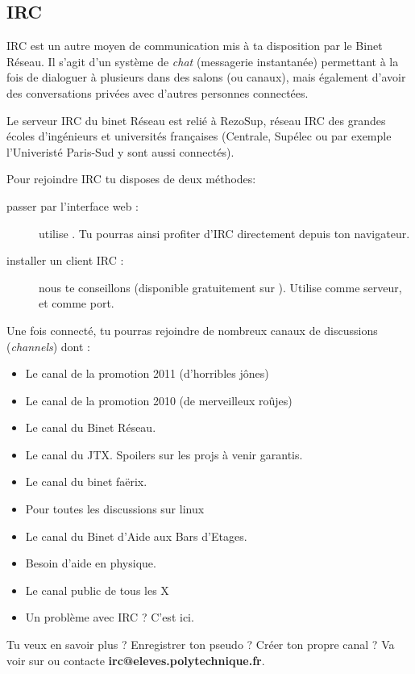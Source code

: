 
\subsection{IRC}

\label{irc}

IRC est un autre moyen de communication mis à ta disposition par le Binet Réseau. Il s'agit d'un système de \emph{chat} (messagerie instantanée) permettant à la fois de dialoguer à plusieurs dans des salons (ou canaux), mais également d'avoir des conversations privées avec d'autres personnes connectées.


Le serveur IRC du binet Réseau est relié à RezoSup, réseau IRC des grandes écoles d'ingénieurs et universités françaises (Centrale, Supélec ou par exemple l'Univeristé Paris-Sud y sont aussi connectés).

Pour rejoindre IRC tu disposes de deux méthodes:

                  
\begin{description}
  \item[passer par l'interface web :] utilise . Tu pourras ainsi profiter d'IRC directement depuis ton navigateur.
  \item[installer un client IRC :] nous te conseillons  (disponible gratuitement sur \linebreak {}). Utilise   comme serveur, et  comme port.
\end{description}

 
Une fois connecté, tu pourras rejoindre de nombreux canaux de discussions (\emph{channels}) dont :
\begin{itemize}
  \item {} Le canal de la promotion 2011 (d'horribles jônes)
  \item {} Le canal de la promotion 2010 (de merveilleux roûjes)
  \item {} Le canal du Binet Réseau.
  \item {} Le canal du JTX. Spoilers sur les projs à venir garantis.
  \item {} Le canal du binet fa\"erix.
  \item {} Pour toutes les discussions sur linux
  \item {} Le canal du Binet d'Aide aux Bars d'Etages.
  \item {} Besoin d'aide en physique.
  \item {} Le canal public de tous les X
  \item {} Un problème avec IRC ? C'est ici.
\end{itemize}

 Tu veux en savoir plus ? Enregistrer ton pseudo ? Créer ton propre canal ? Va voir sur  ou contacte \textbf{irc@eleves.polytechnique.fr}.


